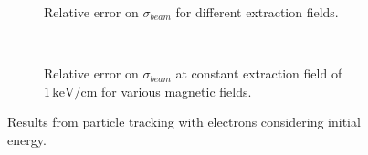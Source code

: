 \begin{figure}[!ht]
	\begin{subfigure}[t]{0.5\textwidth}
		
		\caption{Relative error on $\sigma_{beam}$ for different extraction fields.}
		\label{chap3:ElectronProfile_a}
	\end{subfigure}
	~
	\begin{subfigure}[t]{0.5\textwidth}
		
		\caption{Relative error on $\sigma_{beam}$ at constant extraction field of $1\,\mathrm{keV/cm}$ for various magnetic fields.}
		\label{chap3:ElectronProfile_b}
	\end{subfigure}
	\caption[Results from particle tracking with electrons considering initial energy]{Results from particle tracking with electrons considering initial energy.}
	\label{chap3:ElectronProfile}
\end{figure}